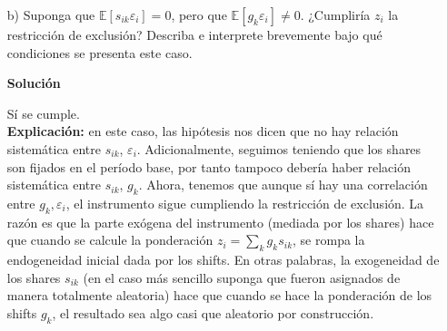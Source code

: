 \documentclass[a4paper, answers, addpoints, 11pt]{exam}
\newenvironment{solucion}{%
  \begin{mdframed}[
    backgroundcolor=blue!5,    %
    linecolor=blue!50,          %
    linewidth=2pt,              %
    leftmargin=10pt,            %
    rightmargin=8pt,           %
    topline=true,              %
    bottomline=true,            %
    roundcorner=10pt,           %
    innerleftmargin=10pt,       %
    innerrightmargin=10pt,      %
    innerbottommargin=10pt,     %
    innertopmargin=10pt         %
  ]%
  \begin{tcolorbox}[colframe=blue!50!black, colback=blue!50, coltitle=white, sharp corners=all, boxrule=1mm, width=\textwidth, halign=left, valign=center, top=0mm, bottom=0mm, left=0mm, right=0mm] \textbf{Solución} \end{tcolorbox} }{\end{mdframed}}
\begin{document}
\begin{enumerate}
\begin{itemize}
\begin{solucion}
\begin{enumerate}
    \item Por a), b) y c) entonces podemos afirmar que no hay relación sistemática entre \(s_{ik}\), \(\varepsilon_i\), y \(g_k\), luego:
    \[\mathbb{E}[s_{ik} g_k \varepsilon_i] =0  
\] 
\end{enumerate} 

\textbf{Interpretación:}\noindent En el escenario ideal del caso (a), ni la estructura industrial preexistente de la región ($s_{ik}$) ni los choques nacionales de importaciones ($g_k$) están correlacionados con otros factores no observados que afectan el crecimiento del empleo regional ($\varepsilon_i$). En otras palabras, la exposición de la región al 'China shock'  a través de $z_i$ es independiente de cualquier otra variable no medida que influya en el resultado ($y_i$). Esto permitiría usar $z_i$ como un instrumento apropiado para estimar el efecto causal del cambio en las importaciones chinas ($x_i$) sobre el crecimiento del empleo regional ($y_i$).


\end{solucion}
        \item[b)] Suponga que $\mathbb{E}[s_{ik}\varepsilon_i] = 0$, pero que $\mathbb{E}[g_k\varepsilon_i] \neq 0$. ¿Cumpliría $z_i$ la restricción de exclusión? Describa e interprete brevemente bajo qué condiciones se presenta este caso.
        \begin{solucion}
         Sí se cumple.\\
         
        \textbf{Explicación:} en este caso, las hipótesis  nos dicen que no hay relación sistemática entre \(s_{ik}\), \(\varepsilon_i\). Adicionalmente, seguimos teniendo que los shares son fijados en el período base, por tanto tampoco debería haber relación sistemática entre \(s_{ik}\), \(g_k\). Ahora, tenemos que aunque sí hay una correlación entre $g_k, \varepsilon_i$, el instrumento sigue cumpliendo la restricción de exclusión. La razón es que la parte exógena del instrumento (mediada por los shares) hace que cuando se calcule la ponderación $z_i=\sum_k g_k s_{ik}$, se rompa la endogeneidad inicial dada por los shifts. En otras palabras, la exogeneidad de los shares $s_{ik}$ (en el caso más sencillo suponga que fueron asignados de manera totalmente aleatoria) hace que cuando se hace la ponderación de los shifts $g_k$, el resultado sea algo casi que aleatorio por construcción. \\
        

\end{solucion}
\end{itemize}
\end{enumerate}
\end{document}
